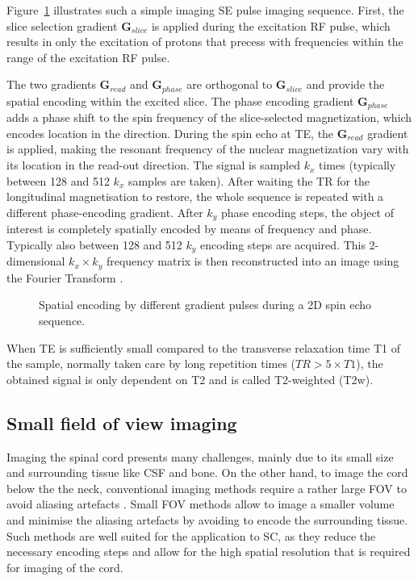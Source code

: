 Figure~\ref{fig:chapter2 SE imaging sequence} illustrates such a simple imaging SE pulse imaging sequence. First, the slice selection gradient $\textbf{G}_{slice}$ is applied during the excitation RF pulse, which results in only the excitation of protons that precess with frequencies within the range of the excitation RF pulse. 

The two gradients $\textbf{G}_{read}$ and $\textbf{G}_{phase}$ are orthogonal to $\textbf{G}_{slice}$ and provide the spatial encoding within the excited slice. The phase encoding gradient $\textbf{G}_{phase}$ adds a phase shift to the spin frequency of the slice-selected magnetization, which encodes location in the  direction. During the spin echo at TE, the $\textbf{G}_{read}$ gradient is applied, making the resonant frequency of the nuclear magnetization vary with its location in the read-out direction. The signal is sampled $k_x$ times (typically between 128 and 512 $k_x$ samples are taken).
After waiting the \gls{TR} for the longitudinal magnetisation to restore, the whole sequence is repeated with a different phase-encoding gradient. After $k_y$ phase encoding steps, the object of interest is completely spatially encoded by means of frequency and phase. Typically also between 128 and 512 $k_y$ encoding steps are acquired. This 2-dimensional $k_x\times k_y$ frequency matrix is then reconstructed into an image using the Fourier Transform \citep{Ljunggren:1983,Twieg:1983}.
\begin{figure}[ht]
\centering
{}
\caption{Spatial encoding by different gradient pulses during a 2D spin echo sequence.}
\label{fig:chapter2 SE imaging sequence}
\end{figure}

When TE is sufficiently small compared to the transverse relaxation time T1 of the sample, normally taken care by long repetition times ($TR>5\times T1 $), the obtained signal is only dependent on T2 and is called T2-weighted (T2w). 

\subsection{Small field of view imaging}
Imaging the spinal cord presents many challenges, mainly due to its small size and surrounding tissue like \gls{CSF} and bone. On the other hand, to image the cord below the the neck, conventional imaging methods require a rather large \gls{FOV} to avoid aliasing artefacts \citep{Bernstein:2004,McRobbie:2002}. Small \gls{FOV} methods allow to image a smaller volume and minimise the aliasing artefacts by avoiding to encode the surrounding tissue\citep{Feinberg:1985}. Such methods are well suited for the application to \gls{SC}, as they reduce the necessary encoding steps and allow for the high spatial resolution that is required for imaging of the cord.  


